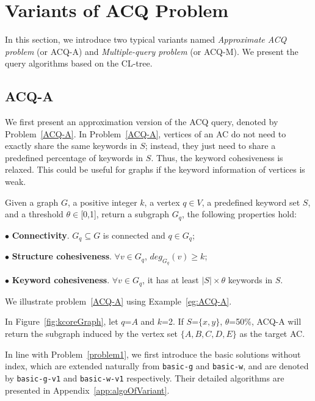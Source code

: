 {\color{blue}
\section{Variants of ACQ Problem}
\label{variant}

In this section, we introduce two typical variants named {\it Approximate ACQ problem} (or ACQ-A) and {\it Multiple-query problem} (or ACQ-M). We present the query algorithms based on the CL-tree.


\subsection{ACQ-A}

We first present an approximation version of the ACQ query, denoted by Problem~\ref{ACQ-A}.
In Problem~\ref{ACQ-A}, vertices of an AC do not need to exactly share the same keywords in $S$;
instead, they just need to share a predefined percentage of keywords in $S$.
Thus, the keyword cohesiveness is relaxed.
This could be useful for graphs if the keyword information of vertices is weak.

\begin{problem}[ACQ-A]
\label{ACQ-A}
Given a graph $G$, a positive integer $k$, a vertex $q \in V$, a predefined keyword set $S$,
and a threshold $\theta\in$[0,1], return a subgraph $G_q$, the following properties hold:

$\bullet$ \textbf{Connectivity}. $G_q \subseteq G$ is connected and $q\in G_q$;

$\bullet$ \textbf{Structure cohesiveness}. $\forall$$v\in G_q$, $deg_{G_q}(v)\geq$$k$;

$\bullet$ \textbf{Keyword cohesiveness}. $\forall v\in G_q$, it has at least $|S|\times \theta$ keywords in $S$.
\end{problem}

We illustrate problem~\ref{ACQ-A} using Example~\ref{eg:ACQ-A}.
\begin{example}
\label{eg:ACQ-A}
In Figure~\ref{fig:kcoreGraph}, let $q$=$A$ and $k$=2.
If $S$=$\{x,y\}$, $\theta$=50\%, ACQ-A will return the subgraph induced by the vertex set $\{A,B,C,D,E\}$ as the target AC.
\end{example}

In line with Problem~\ref{problem1}, we first introduce the basic solutions without index,
which are extended naturally from {\tt basic-g} and {\tt basic-w},
and are denoted by {\tt basic-g-v1} and {\tt basic-w-v1} respectively.
Their detailed algorithms are presented in Appendix~\ref{app:algoOfVariant}.

}
